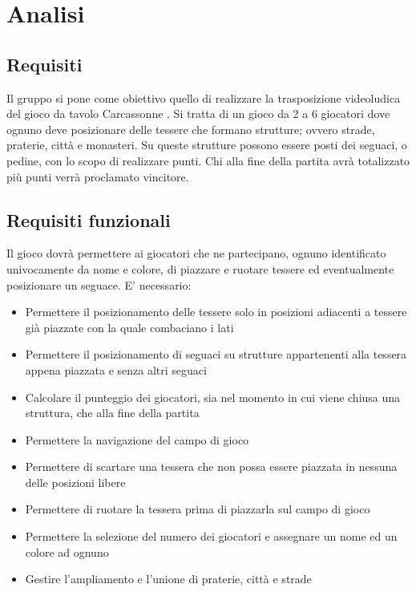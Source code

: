 \section{Analisi}
\subsection{Requisiti}

Il gruppo si pone come obiettivo quello di realizzare la trasposizione videoludica del gioco da tavolo Carcassonne \cite{Carcassonne}. Si tratta di un gioco da 2 a 6 giocatori dove ognuno deve posizionare delle tessere che formano strutture; ovvero strade, praterie, città e monasteri. Su queste strutture possono essere posti dei seguaci, o pedine, con lo scopo di realizzare punti. Chi alla fine della partita avrà totalizzato più punti verrà proclamato vincitore. 

\subsection*{Requisiti funzionali}
Il gioco dovrà permettere ai giocatori che ne partecipano, ognuno identificato univocamente da nome e colore, di piazzare e ruotare tessere ed eventualmente posizionare un seguace. E' necessario:

\begin{itemize}
\item Permettere il posizionamento delle tessere solo in posizioni adiacenti a tessere già piazzate con la quale combaciano i lati
\item Permettere il posizionamento di seguaci su strutture appartenenti alla tessera appena piazzata e senza altri seguaci
\item Calcolare il punteggio dei giocatori, sia nel momento in cui viene chiusa una struttura, che alla fine della partita
\item Permettere la navigazione del campo di gioco
\item Permettere di scartare una tessera che non possa essere piazzata in nessuna delle posizioni libere
\item Permettere di ruotare la tessera prima di piazzarla sul campo di gioco
\item Permettere la selezione del numero dei giocatori e assegnare un nome ed un colore ad ognuno
\item Gestire l'ampliamento e l'unione di praterie, città e strade
\end{itemize}

